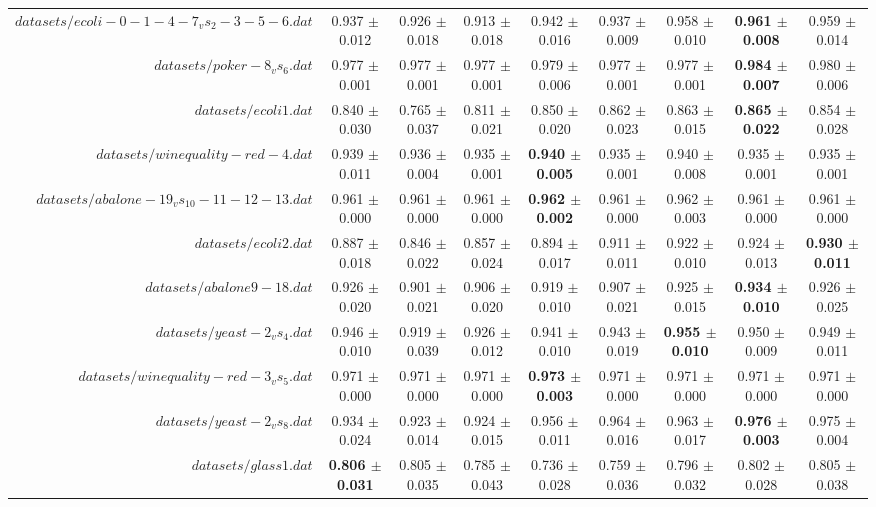 \begin{table}[!ht]
{\begin{tabular}{r c c c c c c c c}
$datasets/ecoli-0-1-4-7_vs_2-3-5-6.dat$ & 0.937 $\pm$ 0.012 & 0.926 $\pm$ 0.018 & 0.913 $\pm$ 0.018 & 0.942 $\pm$ 0.016 & 0.937 $\pm$ 0.009 & 0.958 $\pm$ 0.010 & \textbf{0.961 $\pm$ 0.008} & 0.959 $\pm$ 0.014 \\
$datasets/poker-8_vs_6.dat$ & 0.977 $\pm$ 0.001 & 0.977 $\pm$ 0.001 & 0.977 $\pm$ 0.001 & 0.979 $\pm$ 0.006 & 0.977 $\pm$ 0.001 & 0.977 $\pm$ 0.001 & \textbf{0.984 $\pm$ 0.007} & 0.980 $\pm$ 0.006 \\
$datasets/ecoli1.dat$ & 0.840 $\pm$ 0.030 & 0.765 $\pm$ 0.037 & 0.811 $\pm$ 0.021 & 0.850 $\pm$ 0.020 & 0.862 $\pm$ 0.023 & 0.863 $\pm$ 0.015 & \textbf{0.865 $\pm$ 0.022} & 0.854 $\pm$ 0.028 \\
$datasets/winequality-red-4.dat$ & 0.939 $\pm$ 0.011 & 0.936 $\pm$ 0.004 & 0.935 $\pm$ 0.001 & \textbf{0.940 $\pm$ 0.005} & 0.935 $\pm$ 0.001 & 0.940 $\pm$ 0.008 & 0.935 $\pm$ 0.001 & 0.935 $\pm$ 0.001 \\
$datasets/abalone-19_vs_10-11-12-13.dat$ & 0.961 $\pm$ 0.000 & 0.961 $\pm$ 0.000 & 0.961 $\pm$ 0.000 & \textbf{0.962 $\pm$ 0.002} & 0.961 $\pm$ 0.000 & 0.962 $\pm$ 0.003 & 0.961 $\pm$ 0.000 & 0.961 $\pm$ 0.000 \\
$datasets/ecoli2.dat$ & 0.887 $\pm$ 0.018 & 0.846 $\pm$ 0.022 & 0.857 $\pm$ 0.024 & 0.894 $\pm$ 0.017 & 0.911 $\pm$ 0.011 & 0.922 $\pm$ 0.010 & 0.924 $\pm$ 0.013 & \textbf{0.930 $\pm$ 0.011} \\
$datasets/abalone9-18.dat$ & 0.926 $\pm$ 0.020 & 0.901 $\pm$ 0.021 & 0.906 $\pm$ 0.020 & 0.919 $\pm$ 0.010 & 0.907 $\pm$ 0.021 & 0.925 $\pm$ 0.015 & \textbf{0.934 $\pm$ 0.010} & 0.926 $\pm$ 0.025 \\
$datasets/yeast-2_vs_4.dat$ & 0.946 $\pm$ 0.010 & 0.919 $\pm$ 0.039 & 0.926 $\pm$ 0.012 & 0.941 $\pm$ 0.010 & 0.943 $\pm$ 0.019 & \textbf{0.955 $\pm$ 0.010} & 0.950 $\pm$ 0.009 & 0.949 $\pm$ 0.011 \\
$datasets/winequality-red-3_vs_5.dat$ & 0.971 $\pm$ 0.000 & 0.971 $\pm$ 0.000 & 0.971 $\pm$ 0.000 & \textbf{0.973 $\pm$ 0.003} & 0.971 $\pm$ 0.000 & 0.971 $\pm$ 0.000 & 0.971 $\pm$ 0.000 & 0.971 $\pm$ 0.000 \\
$datasets/yeast-2_vs_8.dat$ & 0.934 $\pm$ 0.024 & 0.923 $\pm$ 0.014 & 0.924 $\pm$ 0.015 & 0.956 $\pm$ 0.011 & 0.964 $\pm$ 0.016 & 0.963 $\pm$ 0.017 & \textbf{0.976 $\pm$ 0.003} & 0.975 $\pm$ 0.004 \\
$datasets/glass1.dat$ & \textbf{0.806 $\pm$ 0.031} & 0.805 $\pm$ 0.035 & 0.785 $\pm$ 0.043 & 0.736 $\pm$ 0.028 & 0.759 $\pm$ 0.036 & 0.796 $\pm$ 0.032 & 0.802 $\pm$ 0.028 & 0.805 $\pm$ 0.038 \\

\end{tabular}}
\end{table}
